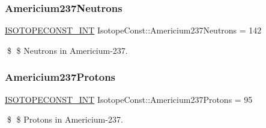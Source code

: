 \subsubsection{\texorpdfstring{Americium237\+Neutrons}{Americium237Neutrons}}
{\footnotesize\ttfamily \mbox{\hyperlink{group___isotope_const-_macros_ga5f18360b3e99483a35c32d789e62621c}{I\+S\+O\+T\+O\+P\+E\+C\+O\+N\+S\+T\+\_\+\+I\+NT}} Isotope\+Const\+::\+Americium237\+Neutrons = 142}

\$ \$ Neutrons in Americium-\/237. \mbox{\label{group___isotope_const-_americium-_am237_ga6b477350f35d954eca255e08667a5371}} 
\subsubsection{\texorpdfstring{Americium237\+Protons}{Americium237Protons}}
{\footnotesize\ttfamily \mbox{\hyperlink{group___isotope_const-_macros_ga5f18360b3e99483a35c32d789e62621c}{I\+S\+O\+T\+O\+P\+E\+C\+O\+N\+S\+T\+\_\+\+I\+NT}} Isotope\+Const\+::\+Americium237\+Protons = 95}

\$ \$ Protons in Americium-\/237. 